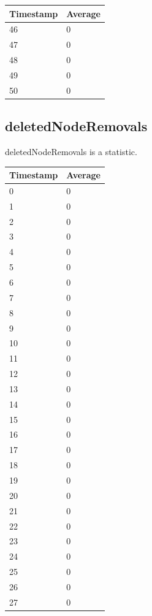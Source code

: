 \begin{tabular}{|l||l|}
\hline
	\textbf{Timestamp} & \textbf{Average} \\ \hline
	46 & 0 \\ \hline
	47 & 0 \\ \hline
	48 & 0 \\ \hline
	49 & 0 \\ \hline
	50 & 0 \\ \hline
\end{tabular}

\subsection{deletedNodeRemovals}
deletedNodeRemovals is a statistic.

%
%
\begin{tabular}{|l||l|}
\hline
	\textbf{Timestamp} & \textbf{Average} \\ \hline
	0 & 0 \\ \hline
	1 & 0 \\ \hline
	2 & 0 \\ \hline
	3 & 0 \\ \hline
	4 & 0 \\ \hline
	5 & 0 \\ \hline
	6 & 0 \\ \hline
	7 & 0 \\ \hline
	8 & 0 \\ \hline
	9 & 0 \\ \hline
	10 & 0 \\ \hline
	11 & 0 \\ \hline
	12 & 0 \\ \hline
	13 & 0 \\ \hline
	14 & 0 \\ \hline
	15 & 0 \\ \hline
	16 & 0 \\ \hline
	17 & 0 \\ \hline
	18 & 0 \\ \hline
	19 & 0 \\ \hline
	20 & 0 \\ \hline
	21 & 0 \\ \hline
	22 & 0 \\ \hline
	23 & 0 \\ \hline
	24 & 0 \\ \hline
	25 & 0 \\ \hline
	26 & 0 \\ \hline
	27 & 0 \\ \hline

\end{tabular}
